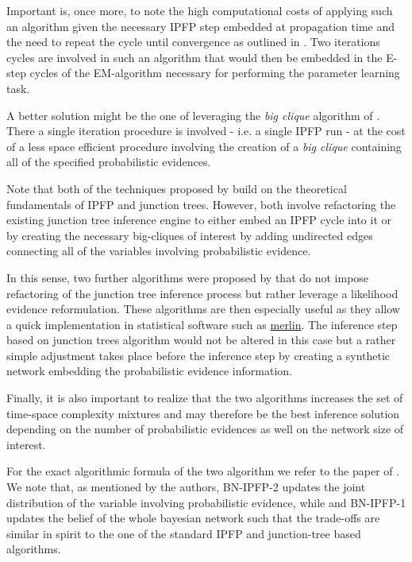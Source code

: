 \documentclass[11pt]{article}
\begin{document}
\begin{article}
Important is, once more, to note the high computational
costs of applying such an algorithm given the necessary IPFP step
embedded at propagation time and the need to repeat the cycle until
convergence as outlined in \cite{Valtorta_2002}. Two iterations cycles are
involved in such an algorithm that would then be embedded in the E-step
cycles of the EM-algorithm necessary for performing the parameter learning task. 

A better solution might be the one of leveraging the \emph{big clique}
algorithm of \cite{Valtorta_2002}. There a single iteration procedure
is involved - i.e. a single IPFP run - at the cost of a less space
efficient procedure involving the creation of a \emph{big clique}
containing all of the specified probabilistic evidences.

Note that both of the techniques proposed by \cite{Valtorta_2002}
build on the theoretical fundamentals of IPFP and junction
trees. However, both involve refactoring the existing junction tree
inference engine to either embed an IPFP cycle into it or by
creating the necessary big-cliques of interest by adding undirected
edges connecting all of the variables involving probabilistic
evidence.

In this sense, two further algorithms were proposed by
\cite{PENG_2010} that do not impose refactoring of the junction tree
inference process but rather leverage a likelihood evidence
reformulation. These algorithms are then especially useful as they
allow a quick implementation in statistical software such as
\href{https://github.com/radum2275/merlin}{merlin}. The inference step based on junction trees algorithm would
not be altered in this case but a rather simple adjustment takes
place before the inference step by creating a synthetic network
embedding the probabilistic evidence information.

Finally, it is also important to realize that the two algorithms
increases the set of time-space complexity mixtures and may
therefore be the best inference solution depending on the number of
probabilistic evidences as well on the network size of interest.

For the exact algorithmic formula of the two algorithm we refer to
the paper of \cite{PENG_2010}. We note that, as mentioned by the
authors, BN-IPFP-2 updates the joint distribution of the variable
involving probabilistic evidence, while and BN-IPFP-1 updates the
belief of the whole bayesian network such that the trade-offs are
similar in spirit to the one of the standard IPFP and junction-tree
based algorithms.


\end{article}
\end{document}
